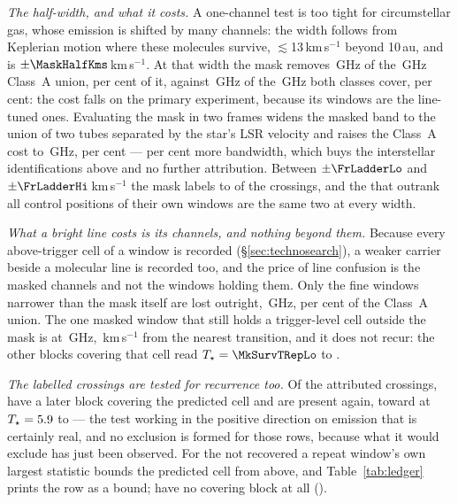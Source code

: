 \emph{The half-width, and what it costs.} A one-channel test is too tight for
circumstellar gas, whose emission is shifted by many channels: the width
follows from Keplerian motion where these molecules survive,
$\lesssim$13\,km\,s$^{-1}$ beyond 10\,au, and is
$\pm\MaskHalfKms$\,km\,s$^{-1}$. At that width the mask removes
\MkMaskAGHz\,GHz of the \CvUnionA\,GHz Class~A union, \MkMaskAPct{} per cent
of it, against \FrMaskLostGHz\,GHz of the \FrMaskUnionGHz\,GHz both classes
cover, \FrMaskPct{} per cent: the cost falls on the primary experiment,
because its windows are the line-tuned ones. Evaluating the mask in two
frames widens the masked band to the union of two tubes separated by the
star's LSR velocity and raises the Class~A cost to \LsMaskTwoGHz\,GHz,
\LsMaskTwoPct{} per cent --- \LsMaskAddPct{} per cent more bandwidth, which
buys the \LsNCloud{} interstellar identifications above and no further
attribution. Between $\pm\FrLadderLo$ and
$\pm\FrLadderHi$\,km\,s$^{-1}$ the mask labels \FrAttrWTwenty{} to
\FrAttrWHundred{} of the crossings, and the \FrNRankPass{} that outrank all
\NCtrl{} control positions of their own windows are the same two at every
width.

\emph{What a bright line costs is its channels, and nothing beyond them.}
Because every above-trigger cell of a window is recorded
(\S\ref{sec:technosearch}), a weaker carrier beside a molecular line is
recorded too, and the price of line confusion is the masked channels and not
the windows holding them. Only the \MkNWholly{} fine windows narrower than
the mask itself are lost outright, \MkWhollyGHz\,GHz, \MkWhollyPct{} per
cent of the Class~A union. The one masked window that still holds a
trigger-level cell outside the mask is \MkSurvStar{} at
\MkSurvFreq\,GHz, \MkSurvDv\,km\,s$^{-1}$ from the nearest transition, and it
does not recur: the \MkSurvNRep{} other blocks covering that cell read
$T_\star=\MkSurvTRepLo$ to \MkSurvTRepHi.

\emph{The labelled crossings are tested for recurrence too.} Of the
\MkAttr{} attributed crossings, \MkAttrTested{} have a later block covering
the predicted cell and \MkAttrRecur{} are present again, toward
\MkAttrRecurStars{} at $T_\star=5.9$ to \MkAttrRecurTHi{} --- the
test working in the positive direction on emission that is certainly real,
and no exclusion is formed for those rows, because what it would exclude has
just been observed. For the \MkAttrExcl{} not recovered a repeat window's own
largest statistic bounds the predicted cell from above, and
Table~\ref{tab:ledger} prints the row as a bound; \MkAttrUntest{} have no
covering block at all (\MkAttrUntestNames).

